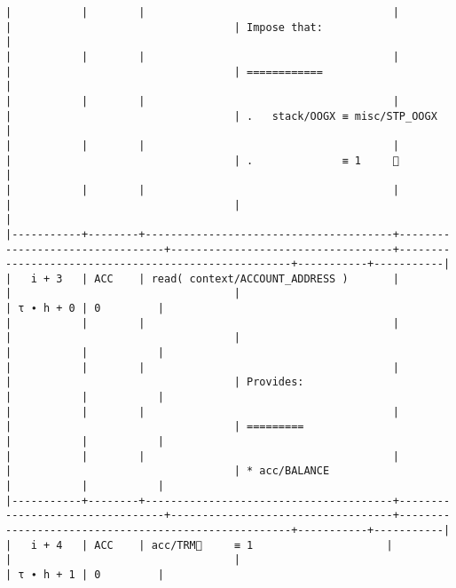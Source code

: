 \documentclass[varwidth=\maxdimen,margin=0.5cm,multi={verbatim}]{standalone}
\begin{document}
\begin{verbatim}
|           |        |                                       |                                 |                                   | Impose that:                                        |
|           |        |                                       |                                 |                                   | ============                                        |
|           |        |                                       |                                 |                                   | .   stack/OOGX ≡ misc/STP_OOGX                      |
|           |        |                                       |                                 |                                   | .              ≡ 1     👋                           |
|           |        |                                       |                                 |                                   |                                                     |
|-----------+--------+---------------------------------------+---------------------------------+-----------------------------------+-----------------------------------------------------+-----------+-----------|
|   i + 3   | ACC    | read( context/ACCOUNT_ADDRESS )       |                                 |                                   |                                                     | τ ∙ h + 0 | 0         |
|           |        |                                       |                                 |                                   |                                                     |           |           |
|           |        |                                       |                                 |                                   | Provides:                                           |           |           |
|           |        |                                       |                                 |                                   | =========                                           |           |           |
|           |        |                                       |                                 |                                   | * acc/BALANCE                                       |           |           |
|-----------+--------+---------------------------------------+---------------------------------+-----------------------------------+-----------------------------------------------------+-----------+-----------|
|   i + 4   | ACC    | acc/TRM🚩     ≡ 1                     |                                 |                                   |                                                     | τ ∙ h + 1 | 0         |

\end{verbatim}
\end{document}

